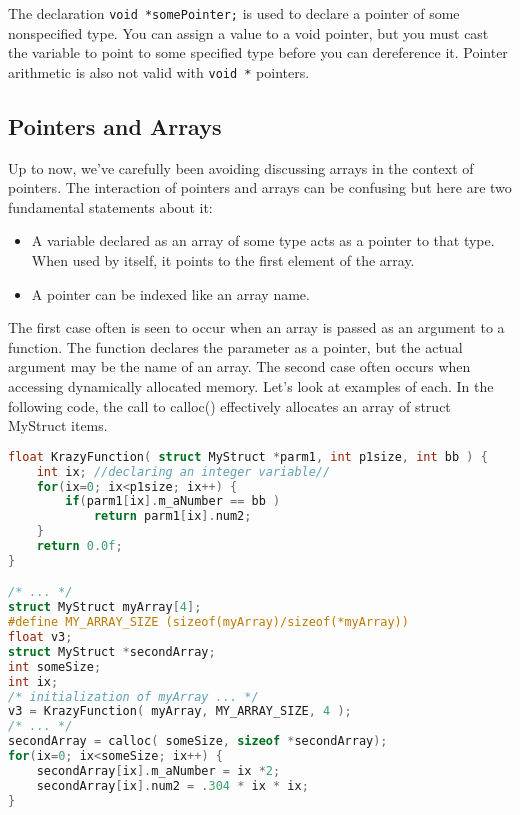 The declaration \texttt{void *somePointer;} is used to declare a pointer of
some nonspecified type. You can assign a value to a void pointer, but you must
cast the variable to point to some specified type before you can dereference
it. Pointer arithmetic is also not valid with \texttt{void *} pointers.

\subsection{Pointers and Arrays}
Up to now, we've carefully been avoiding discussing arrays in the context of
pointers. The interaction of pointers and arrays can be confusing but here are
two fundamental statements about it:
\begin{itemize}
	\item A variable declared as an array of some type acts as a pointer to
that type. When used by itself, it points to the first element of the array.
	\item A pointer can be indexed like an array name.
\end{itemize}

The first case often is seen to occur when an array is passed as an argument to
a function. The function declares the parameter as a pointer, but the actual
argument may be the name of an array. The second case often occurs when
accessing dynamically allocated memory. Let's look at examples of each. In the
following code, the call to calloc() effectively allocates an array of struct
MyStruct items.
\lstset{basicstyle=\scriptsize, numbers=left, captionpos=b, tabsize=4}
\begin{lstlisting}[caption=Section \thesection listing \arabic{pntcnt},language={C},
breaklines=true,xleftmargin=15pt,label=lst:section\thesection listing\arabic{pntcnt}]
float KrazyFunction( struct MyStruct *parm1, int p1size, int bb ) { 
	int ix; //declaring an integer variable//
	for(ix=0; ix<p1size; ix++) {
		if(parm1[ix].m_aNumber == bb )
			return parm1[ix].num2;
	}
	return 0.0f;
}

/* ... */
struct MyStruct myArray[4];
#define MY_ARRAY_SIZE (sizeof(myArray)/sizeof(*myArray))
float v3;
struct MyStruct *secondArray;
int someSize;
int ix;
/* initialization of myArray ... */
v3 = KrazyFunction( myArray, MY_ARRAY_SIZE, 4 );
/* ... */
secondArray = calloc( someSize, sizeof *secondArray);
for(ix=0; ix<someSize; ix++) {
	secondArray[ix].m_aNumber = ix *2;
	secondArray[ix].num2 = .304 * ix * ix;
}
\end{lstlisting}


